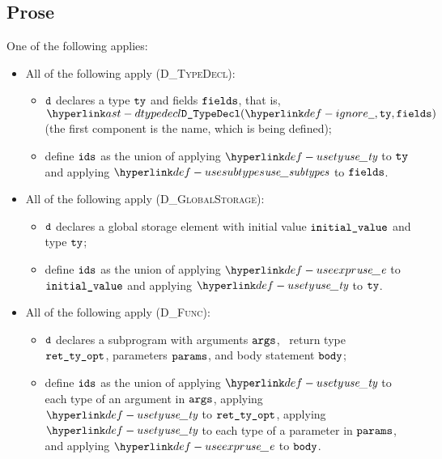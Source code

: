 \subsection{Prose}
One of the following applies:
\begin{itemize}
  \item All of the following apply (\textsc{D\_TypeDecl}):
  \begin{itemize}
    \item $\texttt{d}$ declares a type $\texttt{ty}$ and fields $\texttt{fields}$, that is,
          $\DTypeDecl(\Ignore, \tty, \fields)$ (the first component is the name, which is being defined);
    \item define $\texttt{ids}$ as the union of applying $\usety$ to $\texttt{ty}$ and applying $\usesubtypes$ to $\texttt{fields}$.
  \end{itemize}

  \item All of the following apply (\textsc{D\_GlobalStorage}):
  \begin{itemize}
    \item $\texttt{d}$ declares a global storage element with initial value $\texttt{initial\_value}$ and type $\texttt{ty}$;
    \item define $\texttt{ids}$ as the union of applying $\useexpr$ to $\texttt{initial\_value}$ and applying $\usety$ to $\texttt{ty}$.
  \end{itemize}

  \item All of the following apply (\textsc{D\_Func}):
  \begin{itemize}
    \item $\texttt{d}$ declares a subprogram with arguments $\texttt{args}$, \optional\ return type \\
          $\texttt{ret\_ty\_opt}$, parameters $\texttt{params}$, and body statement $\texttt{body}$;
    \item define $\texttt{ids}$ as the union of applying $\usety$ to each type of an argument in $\texttt{args}$,
          applying $\usety$ to $\texttt{ret\_ty\_opt}$, applying $\usety$ to each type of a parameter in $\texttt{params}$,
          and applying $\useexpr$ to $\texttt{body}$.
  \end{itemize}
\end{itemize}

